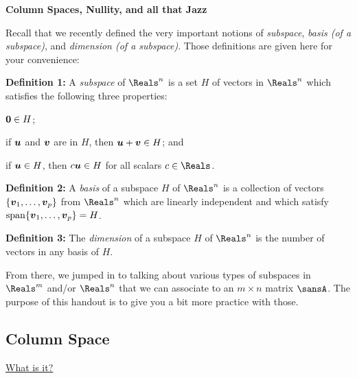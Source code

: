 \documentclass[12 pt]{article}
\begin{document}
\begin{center}
\Large{\textbf{Column Spaces, Nullity, and all that Jazz}}
\end{center}
Recall that we recently defined the very important notions of \textit{subspace}, \textit{basis (of a subspace)}, and \textit{dimension (of a subspace)}. Those definitions are given here for your convenience:

\vspace{3mm}

\begin{adjustwidth}{6mm}{6mm}
	\noindent\textbf{Definition 1:} A \textit{subspace} of $\Reals^n$ is a set $H$ of vectors in $\Reals^n$ which satisfies the following three properties: \begin{enumerate*}[label=(\roman*)]\item $\boldsymbol{0}\in H$; \item if $\boldsymbol{u}$ and $\boldsymbol{v}$ are in $H$, then $\boldsymbol{u}+\boldsymbol{v}\in H$; and \item if $\boldsymbol{u}\in H$, then $c\boldsymbol{u}\in H$ for all scalars $c\in\Reals$.\end{enumerate*}
	
	\vspace{3mm}
	
	\noindent\textbf{Definition 2:} A \textit{basis} of a subspace $H$ of $\Reals^n$ is a collection of vectors $\{\boldsymbol{v}_1,\ldots,\boldsymbol{v}_p\}$ from $\Reals^n$ which are linearly independent and which satisfy $\operatorname{span}\{\boldsymbol{v}_1,\ldots,\boldsymbol{v}_p\}=H$.
	
	\vspace{3mm}
	
	\noindent\textbf{Definition 3:} The \textit{dimension} of a subspace $H$ of $\Reals^n$ is the number of vectors in any basis of $H$.
\end{adjustwidth}

\vspace{3mm}

From there, we jumped in to talking about various types of subspaces in $\Reals^m$ and/or $\Reals^n$ that we can associate to an $m\times n$ matrix $\sansA$. The purpose of this handout is to give you a bit more practice with those.

\subsection*{\hspace{-6.5mm}Column Space}
\noindent\ul{What is it?} 
\end{document}
